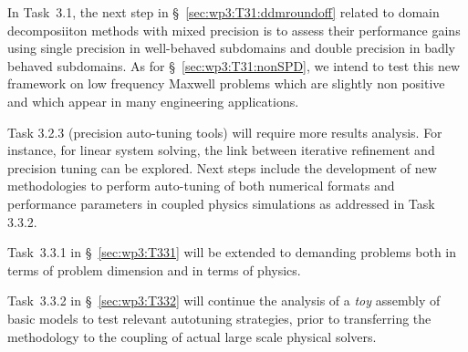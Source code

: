 
In Task~3.1, the next step in \S~\ref{sec:wp3:T31:ddmroundoff} related to domain decomposiiton methods with mixed precision is to assess their performance gains using single precision in well-behaved subdomains and double precision in badly behaved subdomains. As for \S~\ref{sec:wp3:T31:nonSPD}, we intend to test this new framework on low frequency Maxwell problems which are slightly non positive and which appear in many engineering applications. 


Task 3.2.3 (precision auto-tuning tools) will require 
more results analysis. For instance, for linear system solving, the link between iterative refinement and precision tuning can be explored.
Next steps include the development of new methodologies to perform auto-tuning of both numerical formats and performance parameters in coupled physics simulations as addressed in Task 3.3.2.

Task~3.3.1 in \S~\ref{sec:wp3:T331} will be extended to demanding problems both in terms of problem dimension and in terms of physics. 

Task~3.3.2 in \S~\ref{sec:wp3:T332} will continue the analysis of a \textit{toy} assembly of basic models to test relevant autotuning strategies, prior to transferring the methodology to the coupling of actual large scale physical solvers.








